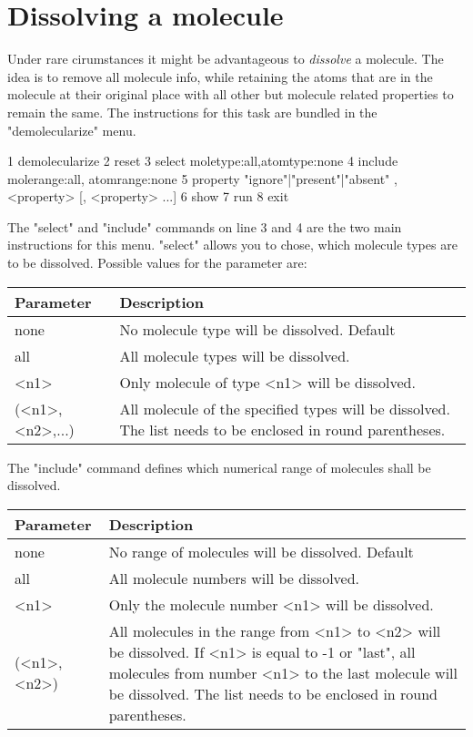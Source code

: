 
\section{Dissolving a molecule \label{mod-demole}}

Under rare cirumstances it might be advantageous to {\it dissolve} a molecule.
The idea is to remove all molecule info, while retaining the atoms that are in
the molecule at their original place with all other but molecule related 
properties to remain the same. The instructions for this task are bundled in
the "demolecularize" menu.

\begin{MacVerbatim}
 1 demolecularize
 2   reset
 3   select moletype:all,atomtype:none
 4   include molerange:all, atomrange:none
 5   property {"ignore"|"present"|"absent"} , <property> [, <property> ...]
 6   show
 7   run
 8 exit
\end{MacVerbatim}

The "select" and "include" commands on line 3 and 4 are the two main instructions
for this menu. "select" allows you to chose, which molecule types are to be 
dissolved. Possible values for the parameter are:

\begin{tabularx}{\textwidth}{|p{30mm}|X|}
  \hline
  {\bf Parameter} & {\bf Description} \\
  \hline\hline
  none    & No  molecule type  will be dissolved. Default\\
  all     & All molecule types will be dissolved.\\
  <n1>    & Only molecule of type <n1> will be dissolved.\\
  (<n1>,<n2>{,...})    & All  molecule of the specified types 
                         will be dissolved. The list needs to be enclosed in
                         round parentheses.\\
  \hline
\end{tabularx}

The "include" command defines which numerical range of molecules shall be 
dissolved. 

\begin{tabularx}{\textwidth}{|p{30mm}|X|}
  \hline
  {\bf Parameter} & {\bf Description} \\
  \hline\hline
  none    & No range of molecules will be dissolved. Default\\
  all     & All molecule numbers will be dissolved.\\
  <n1>    & Only the molecule number  <n1> will be dissolved.\\
  (<n1>,<n2>)    & All  molecules in the range from <n1> to <n2>
                         will be dissolved. If <n1> is equal to -1 or 
                         "last", all molecules from number <n1> to the 
                         last molecule will be dissolved. The list needs to be 
                         enclosed in round parentheses.\\
  \hline
\end{tabularx}

